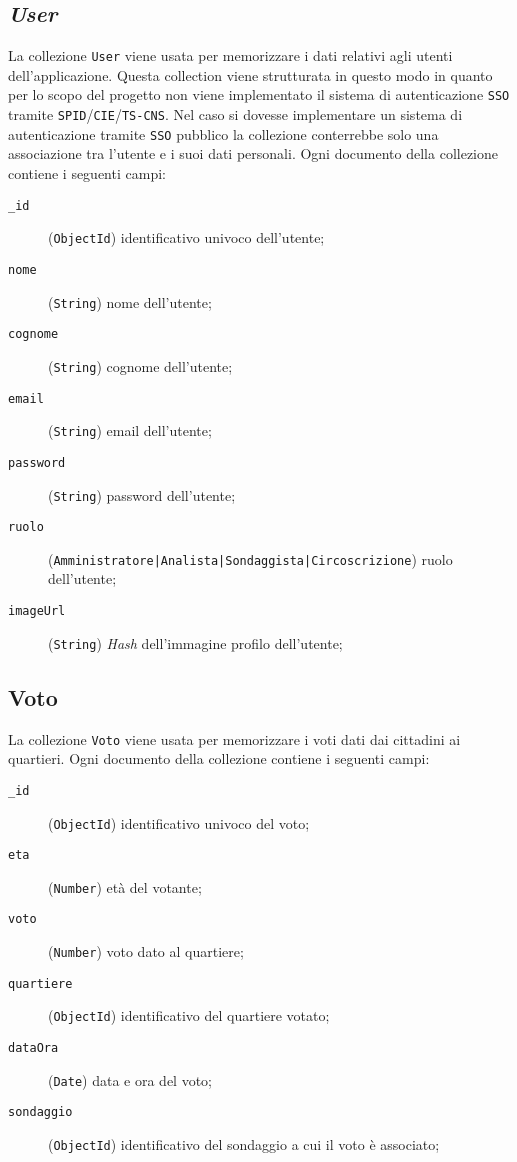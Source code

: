     \subsection{\textit{User}}
        La collezione \texttt{User} viene usata per memorizzare i dati relativi agli utenti dell'applicazione. Questa collection viene strutturata in questo modo in quanto per lo scopo del progetto non viene implementato il sistema di autenticazione \texttt{SSO} tramite \texttt{SPID}/\texttt{CIE}/\texttt{TS-CNS}. Nel caso si dovesse implementare un sistema di autenticazione tramite \texttt{SSO} pubblico la collezione conterrebbe solo una associazione tra l'utente e i suoi dati personali.
        Ogni documento della collezione contiene i seguenti campi:
        \begin{description}
            \item[\texttt{\_id}] (\texttt{ObjectId}) identificativo univoco dell'utente;
            \item[\texttt{nome}] (\texttt{String}) nome dell'utente;
            \item[\texttt{cognome}] (\texttt{String}) cognome dell'utente;
            \item[\texttt{email}] (\texttt{String}) email dell'utente;
            \item[\texttt{password}] (\texttt{String}) password dell'utente;
            \item[\texttt{ruolo}] (\texttt{Amministratore|Analista|Sondaggista|Circoscrizione}) ruolo dell'utente;
            \item[\texttt{imageUrl}] (\texttt{String}) \textit{Hash} dell'immagine profilo dell'utente;
        \end{description}
    \subsection{Voto}
        La collezione \texttt{Voto} viene usata per memorizzare i voti dati dai cittadini ai quartieri. Ogni documento della collezione contiene i seguenti campi:
        \begin{description}
            \item[\texttt{\_id}] (\texttt{ObjectId}) identificativo univoco del voto;
            \item[\texttt{eta}] (\texttt{Number}) età del votante;
            \item[\texttt{voto}] (\texttt{Number}) voto dato al quartiere;
            \item[\texttt{quartiere}] (\texttt{ObjectId}) identificativo del quartiere votato;
            \item[\texttt{dataOra}] (\texttt{Date}) data e ora del voto;
            \item[\texttt{sondaggio}] (\texttt{ObjectId}) identificativo del sondaggio a cui il voto è associato;
        \end{description}
